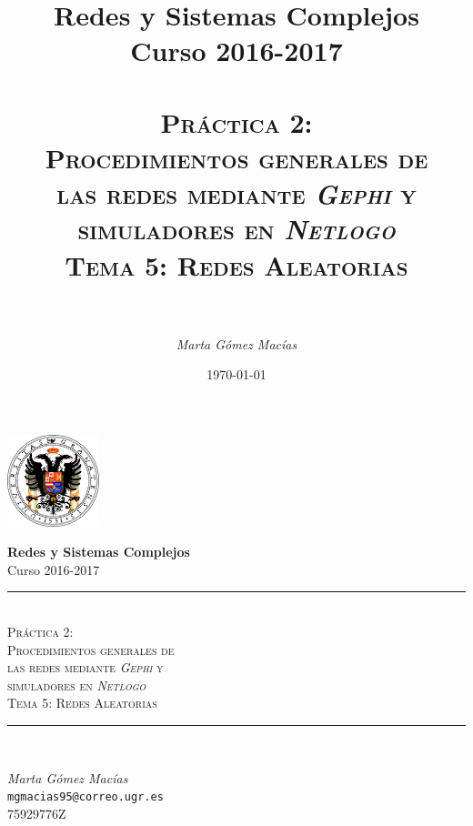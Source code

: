 \documentclass[10pt,a4paper,spanish]{article}
\title{
\normalfont \normalsize 
{\bf Redes y Sistemas Complejos} \\ Curso 2016-2017 \\ [25pt] %
\horrule{0.5pt} \\[0.4cm] %
\huge \textsc{Práctica 2: \\ Procedimientos generales de \\ las redes mediante \textit{Gephi} y \\ simuladores en \textit{Netlogo} \\ Tema 5: Redes Aleatorias} \\ %
\horrule{2pt} \\[0.5cm] %
}
\author{\textit{Marta Gómez Macías}} %
\numberwithin{equation}{section} %
\numberwithin{figure}{section} %
\numberwithin{table}{section} %
\theoremstyle{plain}
\theoremstyle{definition}
\newcommand{\horrule}[1]{\rule{\linewidth}{#1}} %
\begin{document}
\renewcommand{\listtablename}{Índice de tablas}
\renewcommand{\tablename}{Tabla}

\begin{titlepage}
\begin{center}
\includegraphics[width=0.2\textwidth]{../../../ugr}

\normalfont \normalsize 
{\bf Redes y Sistemas Complejos} \\ Curso 2016-2017 \\ [25pt] %
\horrule{0.5pt} \\[0.4cm] %
{\huge \textsc{Práctica 2: \\ Procedimientos generales de \\ las redes mediante \textit{Gephi} y \\ simuladores en \textit{Netlogo} \\[0.5cm] Tema 5: Redes Aleatorias}} %
\horrule{2pt} \\[0.8cm] %

{\Large \textit{Marta Gómez Macías} \\ \texttt{mgmacias95@correo.ugr.es} \\ 75929776Z \\[0.5cm]

\date{\today}} %
\end{center}
\end{titlepage}

\tableofcontents %
\end{document}
